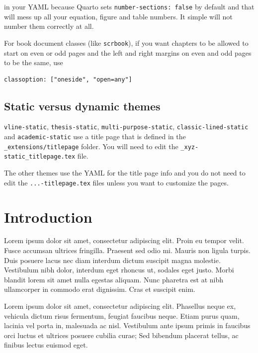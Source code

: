 \documentclass[
  oneside,
  open=any]{scrbook}
\begin{document}
in your YAML because Quarto sets \texttt{number-sections:\ false} by
default and that will mess up all your equation, figure and table
numbers. It simple will not number them correctly at all.

For book document classes (like \texttt{scrbook}), if you want chapters
to be allowed to start on even or odd pages and the left and right
margins on even and odd pages to be the same, use

\begin{verbatim}
classoption: ["oneside", "open=any"]
\end{verbatim}

\hypertarget{static-versus-dynamic-themes}{%
\section{Static versus dynamic
themes}\label{static-versus-dynamic-themes}}

\texttt{vline-static}, \texttt{thesis-static},
\texttt{multi-purpose-static}, \texttt{classic-lined-static} and
\texttt{academic-static} use a title page that is defined in the
\texttt{\_extensions/titlepage} folder. You will need to edit the
\texttt{\_xyz-static\_titlepage.tex} file.

The other themes use the YAML for the title page info and you do not
need to edit the \texttt{...-titlepage.tex} files unless you want to
customize the pages.

\hypertarget{introduction}{%
\chapter{Introduction}\label{introduction}}

Lorem ipsum dolor sit amet, consectetur adipiscing elit. Proin eu tempor
velit. Fusce accumsan ultrices fringilla. Praesent sed odio mi. Mauris
non ligula turpis. Duis posuere lacus nec diam interdum dictum suscipit
magna molestie. Vestibulum nibh dolor, interdum eget rhoncus ut, sodales
eget justo. Morbi blandit lorem sit amet nulla egestas aliquam. Nunc
pharetra est at nibh ullamcorper in commodo erat dignissim. Cras et
suscipit enim.

Lorem ipsum dolor sit amet, consectetur adipiscing elit. Phasellus neque
ex, vehicula dictum risus fermentum, feugiat faucibus neque. Etiam purus
quam, lacinia vel porta in, malesuada ac nisl. Vestibulum ante ipsum
primis in faucibus orci luctus et ultrices posuere cubilia curae; Sed
bibendum placerat tellus, ac finibus lectus euismod eget.
\end{document}
